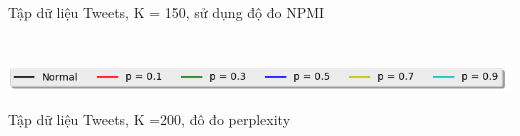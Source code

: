 \documentclass[pdf]{beamer}
\begin{document}
\begin{frame}{Tập dữ liệu Tweets, K = 150, sử dụng độ đo NPMI }
\begin{columns}[T]
\begin{column}{.50\textwidth}
\begin{figure}
\end{figure}				
\end{column} %
\end{columns}
\begin{center}
\includegraphics[width=1\textwidth]{menu.png}	
\end{center}
\end{frame}


\begin{frame}{Tập dữ liệu Tweets, K =200, đô đo perplexity}
\begin{columns}[T] %
\begin{column}{.50\textwidth}
\begin{figure}
\end{figure}
\end{column} %
\hfill%
\begin{column}{.50\textwidth}
\begin{figure}

\end{figure}
\end{column}
\end{columns}
\end{frame}
\end{document}
